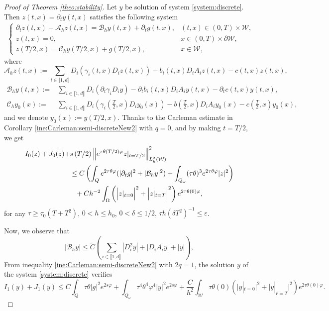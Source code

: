 \documentclass{amsart}
\numberwithin{equation}{section}
\begin{document}
\begin{proof}[Proof of Theorem \ref{theo:stability}] Let $y$ be solution of system \eqref{system:discrete}. Then $z(t,x)=\partial_{t}y(t,x)$ satisfies the following system 
    \begin{align}\label{system:z}
        \begin{cases}
        \partial_{t}z(t,x)-\mathcal{A}_{h}z(t,x)=\mathcal{B}_{h}y(t,x)+\partial_{t}g(t,x),& (t,x)\in(0,T)\times\mathcal{W},\\
        z(t,x)=0, &  x\in (0,T)\times\partial\mathcal{W},\\
        z(T/2,x)=\mathcal{C}_hy(T/2,x)+g(T/2,x),& x\in\mathcal{W},
        \end{cases}
    \end{align}
    where 
\begin{equation*}
\mathcal{A}_{h}z(t,x):= \sum_{i\in\llbracket 1,d\rrbracket}D_{i}\left(\gamma_{i}(t,x)D_{i}z(t,x)\right)-b_{i}(t,x)D_{i}A_{i}z(t,x)-c(t,x)z(t,x),
\end{equation*}
\begin{align*}
\mathcal{B}_{h}y(t,x):= &\sum_{i\in\llbracket 1,d\rrbracket}D_{i}(\partial_{t}\gamma_{i}D_{i}y)-\partial_{t}b_{i}(t,x)D_{i}A_{i}y(t,x)-\partial_{t}c(t,x)y(t,x),\\
\mathcal{C}_{h}y_0(x):= &\sum_{i\in\llbracket 1,d\rrbracket}D_{i}\left(\gamma_{i}\left(\frac{T}{2},x\right)D_{i}y_0(x)\right)-b\left(\frac{T}{2},x\right)D_{i}A_{i}y_0(x)-c\left(\frac{T}{2},x\right)y_0(x),
\end{align*}
and we denote $y_0(x):= y(T/2,x).$
Thanks to the Carleman estimate in Corollary \ref{ine:Carleman:semi-discreteNew2} with $q=0$, and by making $t=T/2$, we get
    \begin{align}\label{ine:2}
        I_{0}(z)+J_{0}(z)+&s\left(T/2\right)\left\|e^{\tau\theta(T/2)\varphi}z|_{t=T/2}\right\|_{L^2_h(\mathcal{W})}^2\\ 
		&\leq  C\left(\int_{Q}e^{2\tau\theta\varphi}(|\partial_{t}g|^{2}+|\mathcal{B}_hy|^2)+\int_{Q_{\omega}}(\tau\theta)^{3}e^{2\tau\theta\varphi}|z|^2\right)\notag\\
		&\phantom{\le}+Ch^{-2}\int_{\Omega} \left(\Big|z|_{t=0}\Big|^2+\Big|z|_{t=T}\Big|^2\right)e^{2\tau\theta(0)\varphi},\notag
    \end{align}
     for any $\tau\geq \tau_{0}(T+T^{2})$, $0<h\leq h_{0}$, $0<\delta \leq 1/2$, $\tau h(\delta T^{2})^{-1}\leq \varepsilon$.
     
  Now, we observe that
  \begin{equation}\label{ine:bound:B}
        |\mathcal{B}_{h}y|\leq \tilde{C}\left(\sum_{i\in\llbracket 1,d\rrbracket}|D_{i}^{2}y|+|D_{i}A_{i}y|+|y|\right),
    \end{equation} From inequality \eqref{ine:Carleman:semi-discreteNew2} with $2q=1$, the solution $y$ of the system \eqref{system:discrete} verifies
  \begin{equation*}
      I_1(y)+J_{1}(y)\leq C\int_{Q}\tau\theta |g|^{2}e^{2s\varphi}+\int_{Q_{ \omega}}\tau^{4}\theta^{4} \varphi^{4}|y|^{2}e^{2s\varphi}+\frac{C}{h^{2}}\int_{\mathcal{W}}\tau\theta(0)\left(\Big|y|_{t=0}\Big|^{2}+\Big|y|_{r=T}\Big|^{2}\right)e^{2\tau\theta(0)\varphi}.
  \end{equation*}
  

\end{proof}
\end{document}
